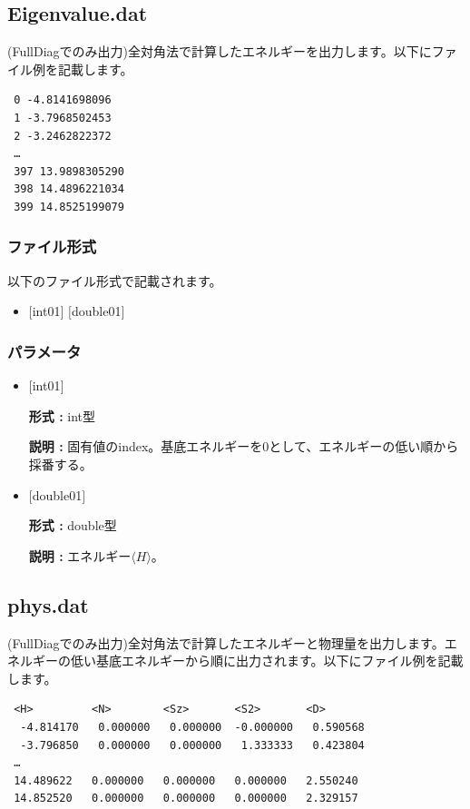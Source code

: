 \newpage
\subsection{Eigenvalue.dat}
\label{Subsec:eigenvalue}
(FullDiagでのみ出力)全対角法で計算したエネルギーを出力します。以下にファイル例を記載します。\\
\begin{minipage}{12.5cm}
\begin{screen}
\begin{verbatim}
 0 -4.8141698096 
 1 -3.7968502453 
 2 -3.2462822372 
 …
 397 13.9898305290 
 398 14.4896221034 
 399 14.8525199079 
\end{verbatim}
\end{screen}
\end{minipage}

\subsubsection{ファイル形式}
以下のファイル形式で記載されます。
 \begin{itemize}
   \item $[$int01$]$ $[$double01$]$ 
  \end{itemize}
\subsubsection{パラメータ}
 \begin{itemize}

  \item  $[$int01$]$
  
 {\bf 形式 :} int型

{\bf 説明 :} 固有値のindex。基底エネルギーを0として、エネルギーの低い順から採番する。

  \item  $[$double01$]$
  
 {\bf 形式 :} double型

{\bf 説明 :} エネルギー$\langle H \rangle$。
 
 \end{itemize}



\newpage
\subsection{phys.dat}
\label{Subsec:phys}
(FullDiagでのみ出力)全対角法で計算したエネルギーと物理量を出力します。エネルギーの低い基底エネルギーから順に出力されます。以下にファイル例を記載します。\\
\begin{minipage}{12.5cm}
\begin{screen}
\begin{verbatim}
 <H>         <N>        <Sz>       <S2>       <D> 
  -4.814170   0.000000   0.000000  -0.000000   0.590568
  -3.796850   0.000000   0.000000   1.333333   0.423804
 …
 14.489622   0.000000   0.000000   0.000000   2.550240
 14.852520   0.000000   0.000000   0.000000   2.329157
\end{verbatim}
\end{screen}
\end{minipage}

